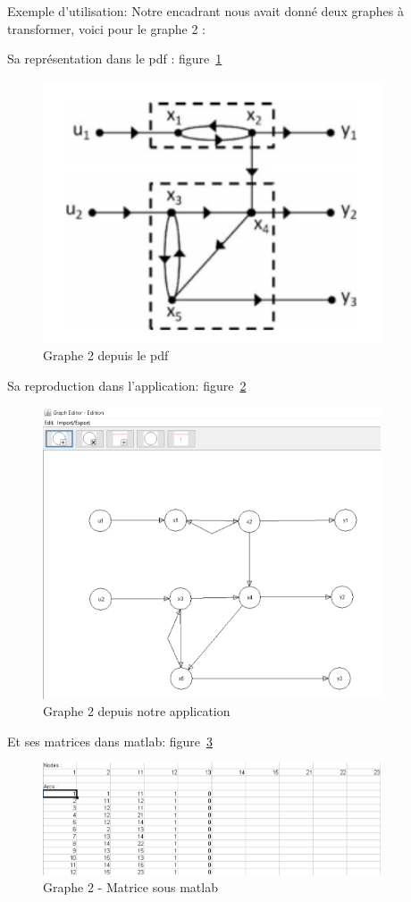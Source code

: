 \documentclass[pidr]{tnreport}
\begin{document}
Exemple d’utilisation: 
Notre encadrant nous avait donné deux graphes à transformer, voici pour le graphe 2 :

Sa représentation dans le pdf : figure~\ref{fig:graph2pdf}

\begin{figure}[h]
  \centering
  \includegraphics[width=10cm]{figures/exemples/graph2pdf}
  \caption{Graphe 2 depuis le pdf}
  \label{fig:graph2pdf}
\end{figure}

Sa reproduction dans l’application:  figure~\ref{fig:graph2App}

\begin{figure}[h]
  \centering
  \includegraphics[width=10cm]{figures/exemples/graph2App}
  \caption{Graphe 2 depuis notre application}
  \label{fig:graph2App}
\end{figure}

Et ses matrices dans matlab: figure~\ref{fig:graph2Matlab}

\begin{figure}[h]
  \centering
  \includegraphics[width=10cm]{figures/exemples/graph2Matlab}
  \caption{Graphe 2 - Matrice sous matlab}
  \label{fig:graph2Matlab}
\end{figure}
\end{document}
